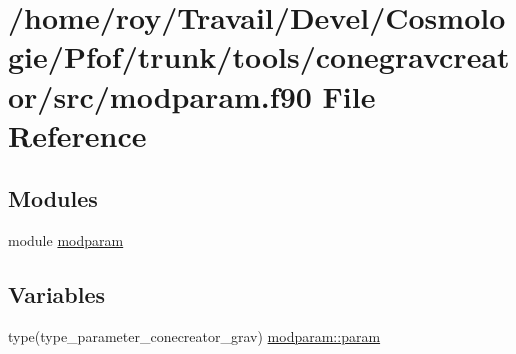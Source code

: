 \hypertarget{modparam_8f90}{}\section{/home/roy/\+Travail/\+Devel/\+Cosmologie/\+Pfof/trunk/tools/conegravcreator/src/modparam.f90 File Reference}
\label{modparam_8f90}
\subsection*{Modules}
\begin{DoxyCompactItemize}
\item 
module \hyperlink{namespacemodparam}{modparam}
\end{DoxyCompactItemize}
\subsection*{Variables}
\begin{DoxyCompactItemize}
\item 
type(type\+\_\+parameter\+\_\+conecreator\+\_\+grav) \hyperlink{namespacemodparam_a3cdea4d6103638af1f6ab9b4bd81bdd6}{modparam\+::param}
\end{DoxyCompactItemize}

